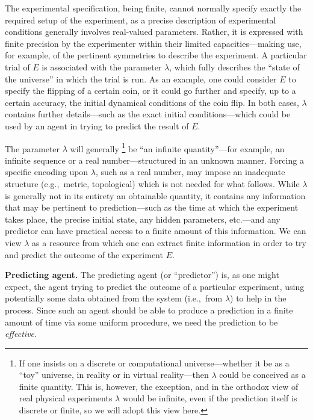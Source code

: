 \documentclass[information,article,submit,moreauthors,pdftex,12pt,a4paper]{mdpi}
\theoremstyle{mdpi}
\newcounter{ex}
\newcounter{re}
\theoremstyle{mdpidefinition}
\begin{document}
The experimental specification, being finite, cannot normally specify exactly the required setup of the experiment, as a precise description of experimental conditions generally involves real-valued parameters.
Rather, it is expressed with finite precision
by the experimenter within their limited capacities---making use, for example, of the pertinent symmetries to describe the experiment.
A particular trial of $E$ is associated with the parameter $\lambda$, which fully describes the ``state of the universe'' in which the trial is run.
As an example, one could consider $E$ to specify the flipping of a certain coin, or it could go further and specify, up to a certain accuracy, the initial dynamical conditions of the coin flip.
In both cases, $\lambda$ contains further details---such as the exact initial conditions---which could be used by an agent in trying to predict the result of $E$.

The parameter $\lambda$ will generally%
\footnote{If one insists on a discrete or computational universe---whether it be as a ``toy'' universe, in reality or in virtual reality---then $\lambda$ could be conceived as a finite quantity. This is, however, the exception, and in the orthodox view of real physical experiments $\lambda$ would be infinite, even if the prediction itself is discrete or finite, so we will adopt this view here.}
be ``an infinite quantity''---for example, an infinite sequence or a real number---structured in an unknown manner.
Forcing a specific encoding upon $\lambda$, such as a real number, may impose an inadequate structure (e.g.,\ metric, topological)  which is not needed for what follows.
While $\lambda$ is generally not in its entirety an obtainable quantity, it contains any information that may be pertinent to prediction---such as the time at which the experiment takes place, the precise initial state, any hidden parameters, etc.---and any predictor can have practical access to a finite amount of this information.
We can view $\lambda$ as a resource from which one can extract finite information in order to try and predict the outcome of the experiment $E$.


\textbf{Predicting agent.}
The predicting agent (or ``predictor'') is, as one might expect, the agent trying to predict the outcome of a particular experiment, using potentially some data obtained from the system (i.e.,\  from $\lambda$) to help in the process.
Since such an agent should be able to produce a prediction in a finite amount of time via some uniform procedure, we need the prediction to be \emph{effective}.
\end{document}
